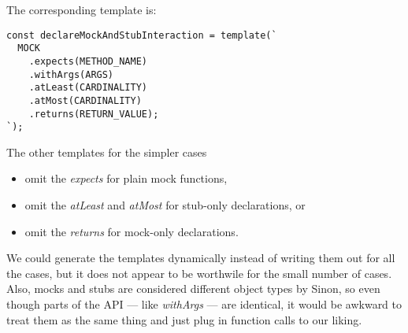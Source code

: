 The corresponding template is:
\begin{verbatim}
const declareMockAndStubInteraction = template(`
  MOCK
    .expects(METHOD_NAME)
    .withArgs(ARGS)
    .atLeast(CARDINALITY)
    .atMost(CARDINALITY)
    .returns(RETURN_VALUE);
`);
\end{verbatim}
The other templates for the simpler cases
\begin{itemize}
  \item omit the \textit{expects} for plain mock functions,
  \item omit the \textit{atLeast} and \textit{atMost} for stub-only declarations, or
  \item omit the \textit{returns} for mock-only declarations.
\end{itemize}

We could generate the templates dynamically
instead of writing them out for all the cases,
but it does not appear to be worthwile for the small number of cases.
Also, mocks and stubs are considered different object types by Sinon,
so even though parts of the API --- like \textit{withArgs} --- are identical,
it would be awkward to treat them as the same thing
and just plug in function calls to our liking.
